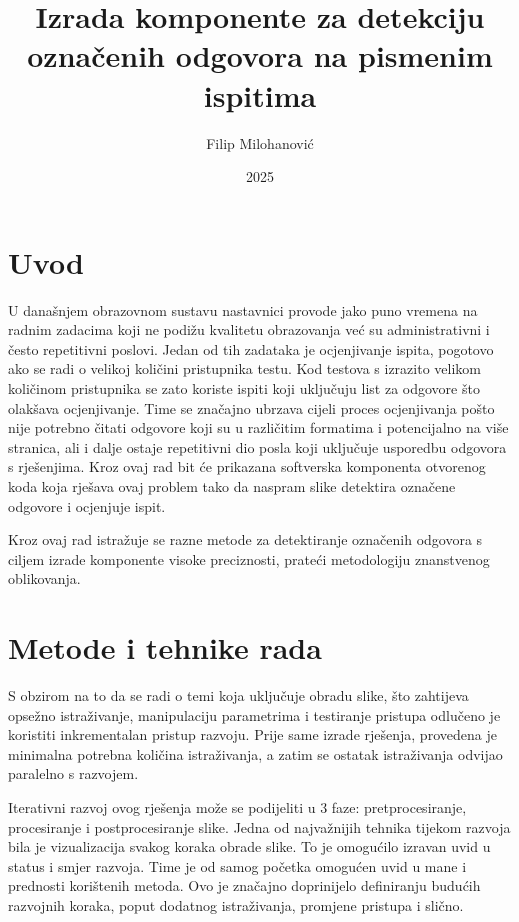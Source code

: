\documentclass{foi}
\title{Izrada komponente za detekciju označenih odgovora na pismenim ispitima}
\author{Filip Milohanović}
\date{2025}
\begin{document}
\maketitle

\tableofcontents

\pagestyle{plain}
\chapter{Uvod}

U današnjem obrazovnom sustavu nastavnici provode jako puno vremena na radnim zadacima koji ne podižu kvalitetu obrazovanja već su administrativni i često repetitivni poslovi. Jedan od tih zadataka je ocjenjivanje ispita, pogotovo ako se radi o velikoj količini pristupnika testu. Kod testova s izrazito velikom količinom pristupnika se zato koriste ispiti koji uključuju list za odgovore što olakšava ocjenjivanje. Time se značajno ubrzava cijeli proces ocjenjivanja pošto nije potrebno čitati odgovore koji su u različitim formatima i potencijalno na više stranica, ali i dalje ostaje repetitivni dio posla koji uključuje usporedbu odgovora s rješenjima. Kroz ovaj rad bit će prikazana softverska komponenta otvorenog koda koja rješava ovaj problem tako da naspram slike detektira označene odgovore i ocjenjuje ispit.

Kroz ovaj rad istražuje se razne metode za detektiranje označenih odgovora s ciljem izrade komponente visoke preciznosti, prateći metodologiju znanstvenog oblikovanja.

\chapter{Metode i tehnike rada}

S obzirom na to da se radi o temi koja uključuje obradu slike, što zahtijeva opsežno istraživanje, manipulaciju parametrima i testiranje pristupa odlučeno je koristiti inkrementalan pristup razvoju. Prije same izrade rješenja, provedena je minimalna potrebna količina istraživanja, a zatim se ostatak istraživanja odvijao paralelno s razvojem.

Iterativni razvoj ovog rješenja može se podijeliti u 3 faze: pretprocesiranje, procesiranje i postprocesiranje slike. Jedna od najvažnijih tehnika tijekom razvoja bila je  vizualizacija svakog koraka obrade slike. To je omogućilo izravan uvid u status i smjer razvoja. Time je od samog početka omogućen uvid u mane i prednosti korištenih metoda. Ovo je značajno doprinijelo definiranju budućih razvojnih koraka, poput  dodatnog istraživanja, promjene pristupa i slično. 
\end{document}

